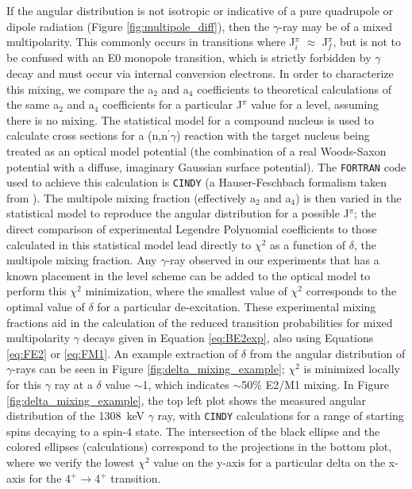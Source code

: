 If the angular distribution is not isotropic or indicative of a pure quadrupole or dipole radiation (Figure \ref{fig:multipole_diff}), then the $\gamma$-ray may be of a mixed multipolarity. This commonly occurs in transitions where J$^\pi_i$ $\approx$ J$^\pi_f$, but is not to be confused with an E0 monopole transition, which is strictly forbidden by $\gamma$ decay and must occur via internal conversion electrons. In order to characterize this mixing, we compare the a$_2$ and a$_4$ coefficients to theoretical calculations of the same a$_2$ and a$_4$ coefficients for a particular J$^\pi$ value for a level, assuming there is no mixing. The statistical model for a compound nucleus is used to calculate cross sections for a (n,n$^\prime\gamma$) reaction with the target nucleus being treated as an optical model potential (the combination of a real Woods-Saxon potential with a diffuse, imaginary Gaussian surface potential). The {\tt FORTRAN} code used to achieve this calculation is {\tt CINDY} (a Hauser-Feschbach formalism taken from \cite{SHELDON197399}). The multipole mixing fraction (effectively a$_2$ and a$_4$) is then varied in the statistical model to reproduce the angular distribution for a possible J$^\pi$; the direct comparison of experimental Legendre Polynomial coefficients to those calculated in this statistical model lead directly to $\chi^2$ as a function of $\delta$, the multipole mixing fraction. Any $\gamma$-ray observed in our experiments that has a known placement in the level scheme can be added to the optical model to perform this $\chi^2$ minimization, where the smallest value of $\chi^2$ corresponds to the optimal value of $\delta$ for a particular de-excitation. These experimental mixing fractions aid in the calculation of the reduced transition probabilities for mixed multipolarity $\gamma$ decays given in Equation \ref{eq:BE2exp}, also using Equations \ref{eq:FE2} or \ref{eq:FM1}. An example extraction of $\delta$ from the angular distribution of $\gamma$-rays can be seen in Figure \ref{fig:delta_mixing_example}; $\chi^2$ is minimized locally for this $\gamma$ ray at a $\delta$ value $\sim$1, which indicates $\sim$50\% E2/M1 mixing. In Figure \ref{fig:delta_mixing_example}, the top left plot shows the measured angular distribution of the 1308~keV $\gamma$ ray, with {\tt CINDY} calculations for a range of starting spins decaying to a spin-4 state. The intersection of the black ellipse and the colored ellipses (calculations) correspond to the projections in the bottom plot, where we verify the lowest $\chi^2$ value on the y-axis for a particular delta on the x-axis for the 4$^+\rightarrow$4$^+$ transition.


